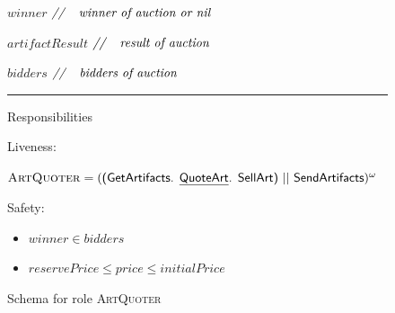 \documentclass[paper=letter, fontsize=12pt]{article}
\begin{document}
\begin{figure}[H]
\begin{center}
{{\par\setlength\parindent{164pt}$winner$ \hspace{4.6em} $\text{\textit{//}} \quad \text{\textit{winner of auction or nil}}$
\par\setlength\parindent{164pt}$artifactResult$ \hspace{1.5em} $\text{\textit{//}} \quad \text{\textit{result of auction}}$
\par\setlength\parindent{164pt}$bidders$ \hspace{4.6em} $\text{\textit{//}} \quad \text{\textit{bidders of auction}}$
\\
\setlength\parindent{14pt} \noindent\rule{15cm}{0.4pt}
\setlength\parindent{14pt} Responsibilities
\par \setlength\parindent{14pt} Liveness:
\par\setlength\parindent{75pt}$\text{\textsc{ArtQuoter}} = (\text{{\fontfamily{\sfdefault}\selectfont 
(GetArtifacts. \underline{QuoteArt}. SellArt) || SendArtifacts}})^{\omega}$

\par \setlength\parindent{14pt} Safety:
\begin{itemize}[leftmargin=20mm]
\item $winner \in bidders$
\item $reservePrice \leq price \leq initialPrice$
\end{itemize}
    }%
}

\caption{Schema for role \textsc{ArtQuoter}}
\label{fig:role_art_quoter}
\end{center}
\end{figure}
\end{document}
